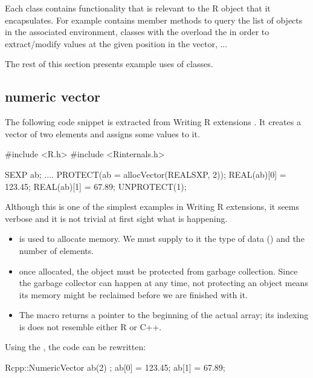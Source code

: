 Each class contains functionality that is relevant to the R object
that it encapsulates. For example  contains 
member methods to query the list of objects in the associated environment, 
classes with the  overload the  in order
to extract/modify values at the given position in the vector, ...

The rest of this section presents example uses of  classes. 

\subsection{numeric vector}

The following code snippet is extracted from Writing R extensions
\citep{R:exts}. It creates a  vector of two elements 
and assigns some values to it. 

\begin{example}
#include <R.h>
#include <Rinternals.h>

SEXP ab;
....
PROTECT(ab = allocVector(REALSXP, 2));
REAL(ab)[0] = 123.45;
REAL(ab)[1] = 67.89;
UNPROTECT(1);
\end{example}

Although this is one of the simplest examples in Writing R extensions, 
it seems verbose and it is not trivial at first sight what is happening.
\begin{itemize}
\item {} is used to allocate memory. We must supply to it 
the type of data () and the number of elements.
\item once allocated, the  object must be protected from
garbage collection. Since the garbage collector can happen at any time, 
not protecting an object means its memory might be reclaimed before we are
finished with it.
\item The  macro returns a pointer to the beginning of the 
actual array; its indexing is does not resemble either R or C++.
\end{itemize}

Using the , the code can be rewritten: 


\begin{example}
Rcpp::NumericVector ab(2) ;
ab[0] = 123.45;
ab[1] = 67.89;
\end{example}

